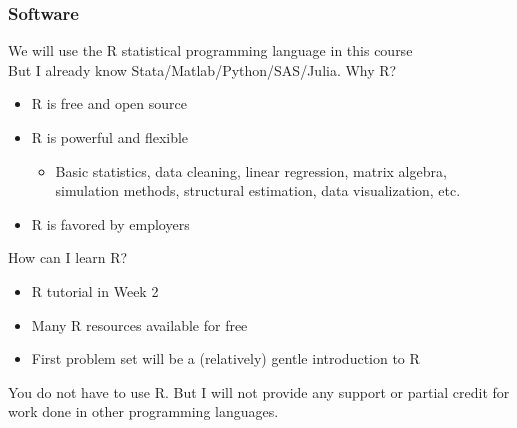 \documentclass{beamer}
\begin{document}

\begin{frame}\frametitle{Software}
    We will use the R statistical programming language in this course \\
    \vspace{2ex}
    But I already know Stata/Matlab/Python/SAS/Julia. Why R?
    \begin{itemize}
        \item R is free and open source
        \item R is powerful and flexible
        \begin{itemize}
            \item Basic statistics, data cleaning, linear regression, matrix algebra, simulation methods, structural estimation, data visualization, etc.
        \end{itemize}
        \item R is favored by employers
    \end{itemize}
    \vspace{2ex}
    How can I learn R?
    \begin{itemize}
        \item R tutorial in Week 2
        \item Many R resources available for free
        \item First problem set will be a (relatively) gentle introduction to R
    \end{itemize}
    \vspace{2ex}
    You do not have to use R. But I will not provide any support or partial credit for work done in other programming languages.
\end{frame}
\end{document}
